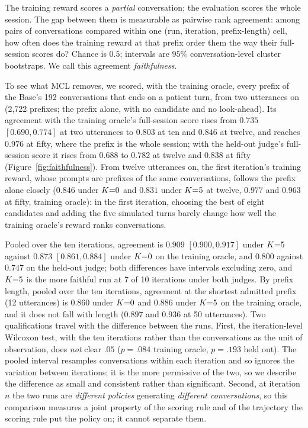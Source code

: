 The training reward scores a \emph{partial} conversation; the evaluation scores the whole session.
The gap between them is measurable as pairwise rank agreement: among pairs of conversations
compared within one (run, iteration, prefix-length) cell, how often does the training reward at
that prefix order them the way their full-session scores do? Chance is $0.5$; intervals are
$95\%$ conversation-level cluster bootstraps. We call this agreement \emph{faithfulness}.

To see what MCL removes, we scored, with the training oracle, every prefix of the Base's 192
conversations that ends on a patient turn, from two utterances on (2{,}722 prefixes; the prefix
alone, with no candidate and no look-ahead). Its agreement with the training oracle's full-session
score rises from $0.735$ $[0.690, 0.774]$ at two utterances to $0.803$ at ten and $0.846$ at
twelve, and reaches $0.976$ at fifty, where the prefix is the whole session; with the held-out
judge's full-session score it rises from $0.688$ to $0.782$ at twelve and $0.838$ at fifty
(Figure~\ref{fig:faithfulness}). From twelve utterances on, the first iteration's training reward,
whose prompts are prefixes of the same conversations, follows the prefix alone closely ($0.846$
under $K{=}0$ and $0.831$ under $K{=}5$ at twelve, $0.977$ and $0.963$ at fifty, training oracle): in
the first iteration, choosing the best of eight candidates and adding the five simulated turns barely change
how well the training oracle's reward ranks conversations.

Pooled over the ten iterations, agreement is $0.909$ $[0.900, 0.917]$ under $K{=}5$ against $0.873$
$[0.861, 0.884]$ under $K{=}0$ on the training oracle, and $0.800$ against $0.747$ on the held-out
judge; both differences have intervals excluding zero, and $K{=}5$ is the more faithful run at 7 of
10 iterations under both judges. By prefix length, pooled over the ten iterations, agreement at the
shortest admitted prefix (12 utterances) is $0.860$ under $K{=}0$ and $0.886$ under $K{=}5$ on the
training oracle, and it does not fall with length ($0.897$ and $0.936$ at 50 utterances). Two
qualifications travel with the difference between the runs. First, the
iteration-level Wilcoxon test, with the ten iterations rather than the conversations as the unit of
observation, does \emph{not} clear $.05$ ($p = .084$ training oracle, $p = .193$ held out). The
pooled interval resamples conversations within each iteration and so ignores the variation between
iterations; it is the more permissive of the two, so we
describe the difference as small and consistent rather than significant. Second, at iteration $n$
the two runs are \emph{different policies} generating \emph{different conversations}, so this
comparison measures a joint property of the scoring rule and of the trajectory the scoring rule put
the policy on; it cannot separate them.

